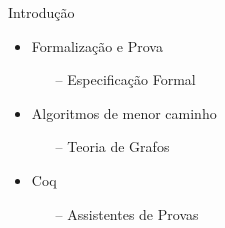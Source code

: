 
\begin{frame}{Introdução}
    \begin{itemize}
        \item Formalização e Prova
        \begin{itemize}
            \item [--] Especificação Formal
        \end{itemize}
        \item Algoritmos de menor caminho
        \begin{itemize}
            \item [--] Teoria de Grafos
        \end{itemize}
        \item Coq
        \begin{itemize}
            \item [--] Assistentes de Provas
        \end{itemize}
    \end{itemize}
\end{frame}